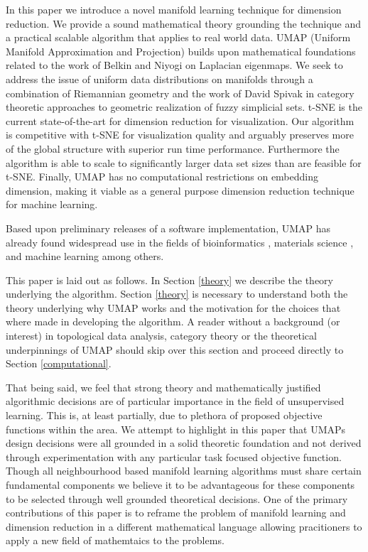 \documentclass[12pt]{article}
\begin{document}
In this paper we introduce a novel manifold learning technique for dimension reduction.  We provide a sound mathematical theory grounding the technique and a practical scalable algorithm that applies to real world data. UMAP (Uniform Manifold Approximation and Projection) builds upon mathematical foundations related to the work of Belkin and Niyogi on Laplacian eigenmaps.  We seek to address the issue of uniform data distributions on manifolds through a combination of Riemannian geometry and the work of David Spivak \cite{spivakmetric} in category theoretic approaches to geometric realization of fuzzy simplicial sets.  t-SNE is the current state-of-the-art for dimension reduction for visualization.  Our algorithm is competitive with t-SNE for visualization quality and arguably preserves more of the global structure with superior run time performance. 
Furthermore the algorithm is able to scale to significantly larger data set sizes than are feasible for t-SNE.
Finally, UMAP has no computational restrictions on embedding dimension, making it viable as a general purpose dimension reduction technique for machine learning.

Based upon preliminary releases of a software implementation, UMAP has already found widespread use in the fields of bioinformatics \cite{becht2019dimensionality, cao2019single, diaz2018revealing, park2018fast, bagger2018bloodspot, Oetjen416750, clark2018comprehensive}, materials science \cite{li2019manifold, fuhrimann2018data}, and machine learning \cite{carter2019activation, espadoto2019deep, espadotovisual, gaujac2018gaussian, escolano2018self, posada2018msc} among others. 

This paper is laid out as follows. In Section \ref{theory} we describe the theory underlying the algorithm.  Section \ref{theory} is necessary to understand both the theory underlying why UMAP works and the motivation for the choices that where made in developing the algorithm.  A reader without a background (or interest) in topological data analysis, category theory or the theoretical underpinnings of UMAP should skip over this section and proceed directly to Section \ref{computational}.

That being said, we feel that strong theory and mathematically justified algorithmic decisions are of particular importance in the field of unsupervised learning.  This is, at least partially, due to plethora of proposed objective functions within the area. We attempt to highlight in this paper that UMAPs design decisions were all grounded in a solid theoretic foundation and not derived through experimentation with any particular task focused objective function.  Though all neighbourhood based manifold learning algorithms must share certain fundamental components we believe it to be advantageous for these components to be selected through well grounded theoretical decisions. One of the primary contributions of this paper is to reframe the problem of manifold learning and dimension reduction in a different mathematical language allowing pracitioners to apply a new field of mathemtaics to the problems. 
\end{document}
